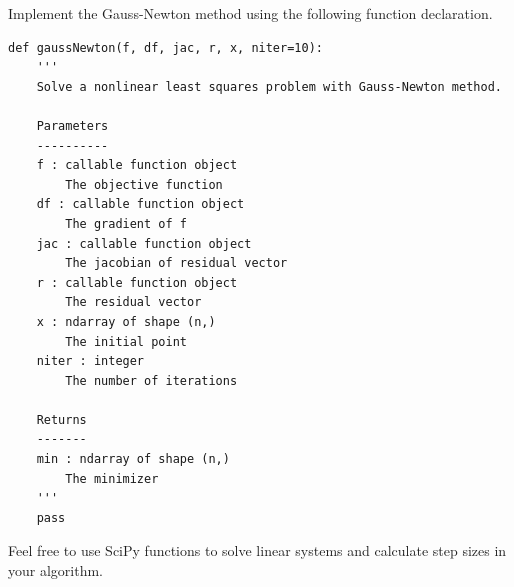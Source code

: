\begin{problem}
Implement the Gauss-Newton method using the following function declaration.
\begin{lstlisting}
def gaussNewton(f, df, jac, r, x, niter=10):
    '''
    Solve a nonlinear least squares problem with Gauss-Newton method.
    
    Parameters
    ----------
    f : callable function object
        The objective function
    df : callable function object
        The gradient of f
    jac : callable function object
        The jacobian of residual vector
    r : callable function object 
        The residual vector
    x : ndarray of shape (n,) 
        The initial point
    niter : integer 
        The number of iterations
    
    Returns
    -------
    min : ndarray of shape (n,)
        The minimizer
    '''
    pass
\end{lstlisting}

Feel free to use SciPy functions to solve linear systems and calculate step sizes in your algorithm.
\end{problem}

